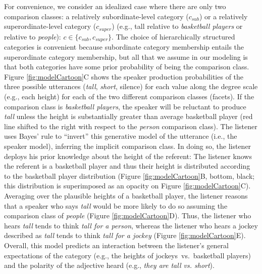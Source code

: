 \documentclass[doc, floatsintext]{apa6}
\begin{document}

For convenience, we consider an idealized case where there are only two comparison classes: a relatively subordinate-level category ($c_{sub}$) or a relatively superordinate-level category ($c_{super}$) (e.g., tall relative to \emph{basketball players} or relative to \emph{people}): \(c \in \{c_{sub}, c_{super}\}\).
The choice of hierarchically structured categories is convenient because subordinate category membership entails the superordinate category membership, but all that we assume in our modeling is that both categories have some prior probability of being the comparison class. 
Figure \ref{fig:modelCartoon}C shows the speaker production probabilities of the three possible utterances (\emph{tall}, \emph{short}, silence) for each value along the degree scale (e.g., each height) for each of the two different comparison classes (facets).
If the comparison class is \emph{basketball players}, the speaker will be reluctant to produce \emph{tall} unless the height is substantially greater than average basketball player (red line shifted to the right with respect to the \emph{person} comparison class).
The listener uses Bayes' rule to ``invert'' this generative model of the utterance (i.e., the speaker model), inferring the implicit comparison class.
In doing so, the listener deploys his prior knowledge about the height of the referent: The listener knows the referent is a basketball player and thus their height is distributed according to the basketball player distribution (Figure \ref{fig:modelCartoon}B, bottom, black; this distribution is superimposed as an opacity on Figure \ref{fig:modelCartoon}C).
Averaging over the plausible heights of a basketball player, the listener reasons that a speaker who says \emph{tall} would be more likely to do so assuming the comparison class of \emph{people}  (Figure \ref{fig:modelCartoon}D).
Thus, the listener who hears \emph{tall} tends to think \emph{tall for a person}, whereas the listener who hears a jockey described as \emph{tall} tends to think \emph{tall for a jockey} (Figure \ref{fig:modelCartoon}E).
Overall, this model predicts an interaction between the listener's general expectations of the category (e.g., the heights of jockeys~vs.~basketball players) and the polarity of the adjective heard (e.g., \emph{they are tall vs. short}).
\end{document}
